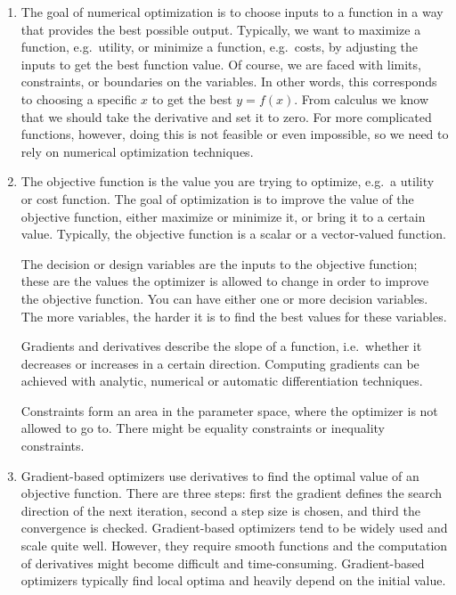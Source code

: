 \begin{enumerate}

\item
The goal of numerical optimization is to choose inputs to a function in a way that provides the best possible output.
Typically, we want to maximize a function, e.g.\ utility,
  or minimize a function, e.g.\ costs,
  by adjusting the inputs to get the best function value.
Of course, we are faced with limits, constraints, or boundaries on the variables.
In other words, this corresponds to choosing a specific \(x\) to get the best \(y=f(x)\).
From calculus we know that we should take the derivative and set it to zero.
For more complicated functions, however, doing this is not feasible or even impossible,
  so we need to rely on numerical optimization techniques.

\item
The objective function is the value you are trying to optimize,
  e.g.\ a utility or cost function.
The goal of optimization is to improve the value of the objective function,
  either maximize or minimize it, or bring it to a certain value.
Typically, the objective function is a scalar or a vector-valued function.

The decision or design variables are the inputs to the objective function;
  these are the values the optimizer is allowed to change
  in order to improve the objective function.
You can have either one or more decision variables.
The more variables, the harder it is to find the best values for these variables.

Gradients and derivatives describe the slope of a function,
  i.e.\ whether it decreases or increases in a certain direction.
Computing gradients can be achieved with analytic, numerical or automatic differentiation techniques.

Constraints form an area in the parameter space,
  where the optimizer is not allowed to go to.
There might be equality constraints or inequality constraints.

\item
Gradient-based optimizers use derivatives to find the optimal value of an objective function.
There are three steps:
  first the gradient defines the search direction of the next iteration,
  second a step size is chosen,
  and third the convergence is checked.
Gradient-based optimizers tend to be widely used and scale quite well.
However, they require smooth functions and the computation of derivatives might become difficult and time-consuming.
Gradient-based optimizers typically find local optima and heavily depend on the initial value.


\end{enumerate}
